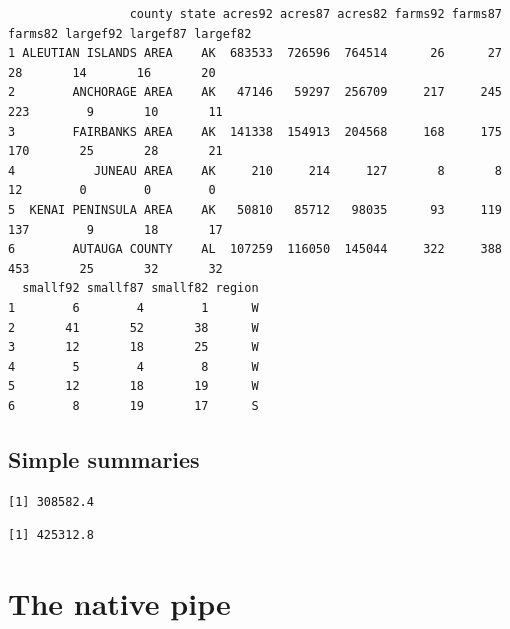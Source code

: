 \documentclass[
  letterpaper,
  DIV=11,
  numbers=noendperiod]{scrreprt}
\newenvironment{Shaded}{\begin{snugshade}}{\end{snugshade}}
\newcommand{\AttributeTok}[1]{\textcolor[rgb]{0.40,0.45,0.13}{#1}}
\newcommand{\ConstantTok}[1]{\textcolor[rgb]{0.56,0.35,0.01}{#1}}
\newcommand{\FunctionTok}[1]{\textcolor[rgb]{0.28,0.35,0.67}{#1}}
\newcommand{\NormalTok}[1]{\textcolor[rgb]{0.00,0.23,0.31}{#1}}
\newcommand{\SpecialCharTok}[1]{\textcolor[rgb]{0.37,0.37,0.37}{#1}}
\renewcommand{\[}{\begin{equation}}
\renewcommand{\]}{\end{equation}}
\begin{document}
\begin{verbatim}
                 county state acres92 acres87 acres82 farms92 farms87 farms82 largef92 largef87 largef82
1 ALEUTIAN ISLANDS AREA    AK  683533  726596  764514      26      27      28       14       16       20
2        ANCHORAGE AREA    AK   47146   59297  256709     217     245     223        9       10       11
3        FAIRBANKS AREA    AK  141338  154913  204568     168     175     170       25       28       21
4           JUNEAU AREA    AK     210     214     127       8       8      12        0        0        0
5  KENAI PENINSULA AREA    AK   50810   85712   98035      93     119     137        9       18       17
6        AUTAUGA COUNTY    AL  107259  116050  145044     322     388     453       25       32       32
  smallf92 smallf87 smallf82 region
1        6        4        1      W
2       41       52       38      W
3       12       18       25      W
4        5        4        8      W
5       12       18       19      W
6        8       19       17      S
\end{verbatim}

\subsection{Simple summaries}\label{simple-summaries}

\begin{Shaded}
\end{Shaded}

\begin{verbatim}
[1] 308582.4
\end{verbatim}

\begin{Shaded}
\end{Shaded}

\begin{verbatim}
[1] 425312.8
\end{verbatim}

\section{The native pipe}\label{the-native-pipe}
\end{document}
